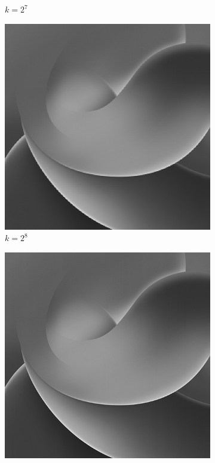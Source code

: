 \begin{figure}[H]
\begin{subfigure}[b]{0.3\textwidth}
        \caption{$k = 2^7$}
    \end{subfigure}
    \hfill
    \begin{subfigure}[b]{0.3\textwidth}
        \centering
        \includegraphics[width=\textwidth]{problem2/low_freq_256.bmp}
        \caption{$k = 2^8$}
    \end{subfigure}
    \begin{subfigure}[b]{0.3\textwidth}
        \centering
        \includegraphics[width=\textwidth]{problem2/low_freq_512.bmp}

\end{subfigure}
\end{figure}
